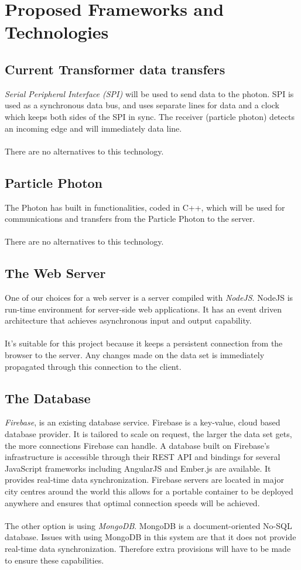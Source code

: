 \documentclass[paper=a4, fontsize=11pt]{scrartcl} %
\begin{document}
	
	\newpage
	\section{Proposed Frameworks and Technologies}
	\subsection{Current Transformer data transfers}
	\textit{Serial Peripheral Interface (SPI)} will be used to send data to the photon. SPI is used as a synchronous data bus,
	and uses separate lines for data and a clock which keeps both sides of the SPI in sync. The receiver (particle photon) detects an incoming 
	edge and will immediately data line.\\
	\\There are no alternatives to this technology.
	
	\subsection{Particle Photon}
	The Photon has built in functionalities, coded in C++, which will be used for communications and transfers from the Particle Photon to the server.\\ 
	\\There are no alternatives to this technology.
	
	\subsection{The Web Server}
	One of our choices for a web server is a server compiled with \textit{NodeJS}. NodeJS is run-time environment for server-side web applications. It has an event driven architecture that achieves asynchronous input and output capability.\\
	\\
	It's suitable for this project because it keeps a persistent connection
	from the browser to the server. Any changes made on the data set is immediately propagated through this connection to the client.
	
	\subsection{The Database}
	\textit{Firebase}, is an existing database service. Firebase is a key-value, cloud based database provider. It is tailored to scale on request, the larger the data set gets, the more connections Firebase can handle. A database built on Firebase's infrastructure is accessible through their REST API and bindings for several JavaScript frameworks including AngularJS and Ember.js are available. It provides real-time data synchronization. Firebase servers are located in major city centres around the world this allows for a portable container to be deployed anywhere and ensures that optimal connection speeds will be achieved.\\\\The other option is using \textit{MongoDB}. MongoDB is a document-oriented No-SQL database. Issues with using MongoDB in this system are that it does not provide real-time data synchronization. Therefore extra provisions will have to be made to ensure these capabilities.
	
\end{document}
